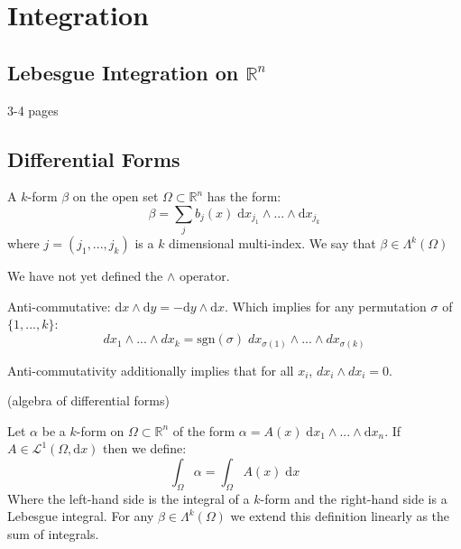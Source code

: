 \chapter{Integration} \label{integration}
\doublespacing


\section{Lebesgue Integration on $\mathbb{R}^n$}

3-4 pages

\newpage \addtocounter{page}{2} 

\section{Differential Forms}

\begin{definition}
A $k$-form $\beta$ on the open set $\Omega \subset \mathbb{R}^n$ has the form:
\begin{equation}
\beta = \sum_j b_j(x) \; \text{d} x_{j_1} \wedge ... \wedge \text{d} x_{j_k}
\end{equation}
where $j=(j_1, ..., j_k)$ is a $k$ dimensional multi-index. We say that $\beta \in \Lambda^k(\Omega)$
\end{definition}

We have not yet defined the $\wedge$ operator.

Anti-commutative: $\text{d} x \wedge \text{d} y = - \text{d}y \wedge \text{d} x$. 
Which implies for any permutation $\sigma$ of $\{1,...,k\}$:
\begin{equation}
dx_1 \wedge ... \wedge dx_k = \text{sgn}(\sigma) \; dx_{\sigma(1)} \wedge ... \wedge dx_{\sigma(k)}
\end{equation}

Anti-commutativity additionally implies that for all $x_i$, $dx_i \wedge dx_i = 0$. 

(algebra of differential forms)


\begin{definition}
Let $\alpha$ be a $k$-form on $\Omega \subset \mathbb{R}^n$ of the form $\alpha = A(x) \; \text{d}x_1 \wedge ... \wedge \text{d} x_n$.
If $A \in \mathcal{L}^1 (\Omega , \text{d}x)$ then we define:
\begin{equation}
\int_\Omega \alpha = \int_\Omega A(x) \; \text{d}x
\end{equation}
Where the left-hand side is the integral of a $k$-form and the right-hand side is a Lebesgue integral.
For any $\beta \in \Lambda^k (\Omega)$ we extend this definition linearly as the sum of integrals.
\end{definition}


